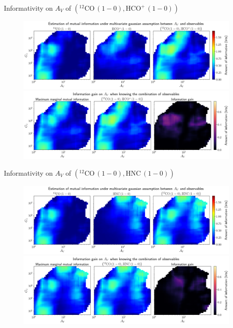 \documentclass{beamer}
\begin{document}
\begin{frame}{Informativity on $A_V$ of $\left(\mathrm{^{12}CO\,(1-0)},\mathrm{HCO^+\,(1-0)}\right)$}
    \begin{figure}
        \centering
        \includegraphics[width=0.95\linewidth]{../linearinfogauss/av__12co10_hcop10_linearinfogauss.png}
        \vfill
        \includegraphics[width=0.95\linewidth]{../linearinfogauss/av__12co10_hcop10_linearinfogauss_gain.png}
    \end{figure}
\end{frame}

\begin{frame}{Informativity on $A_V$ of $\left(\mathrm{^{12}CO\,(1-0)},\mathrm{HNC\,(1-0)}\right)$}
    \begin{figure}
        \centering
        \includegraphics[width=0.95\linewidth]{../linearinfogauss/av__12co10_hnc10_linearinfogauss.png}
        \vfill
        \includegraphics[width=0.95\linewidth]{../linearinfogauss/av__12co10_hnc10_linearinfogauss_gain.png}
    \end{figure}
\end{frame}
\end{document}
